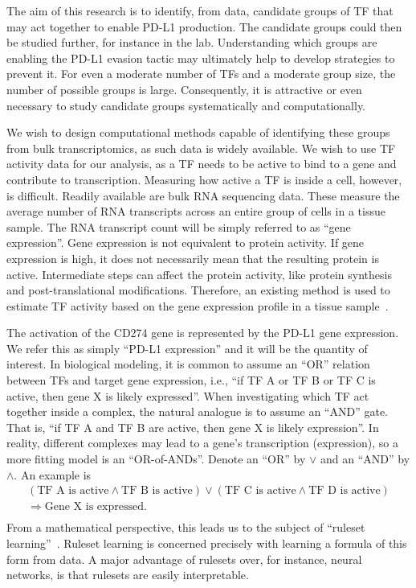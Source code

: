 The aim of this research is to identify, from data, candidate groups of TF that may act together to enable PD-L1 production.
The candidate groups could then be studied further, for instance in the lab.
Understanding which groups are enabling the PD-L1 evasion tactic may ultimately help to develop strategies to prevent it.
For even a moderate number of TFs and a moderate group size, the number of possible groups is large.
Consequently, it is attractive or even necessary to study candidate groups systematically and computationally.

We wish to design computational methods capable of identifying these groups from bulk transcriptomics,
as such data is widely available.
We wish to use TF activity data for our analysis,
as a TF needs to be active to bind to a gene and contribute to transcription.
Measuring how active a TF is inside a cell, however, is difficult.
Readily available are bulk RNA sequencing data.
These measure the average number of RNA transcripts across an entire group of cells in a tissue sample.
The RNA transcript count will be simply referred to as ``gene expression''.
Gene expression is not equivalent to protein activity.
If gene expression is high, it does not necessarily mean that the resulting protein is active.
Intermediate steps can affect the protein activity, like protein synthesis and post-translational modifications.
Therefore, an existing method is used to estimate TF activity based on the gene expression profile in a tissue sample~\cite{badia-i-mompel_decoupler_2022}.

The activation of the CD274 gene is represented by the PD-L1 gene expression.
We refer this as simply ``PD-L1 expression'' and it will be the quantity of interest.
In biological modeling, it is common to assume an ``OR'' relation between TFs and target gene expression, i.e.,
``if TF A or TF B or TF C is active, then gene X is likely expressed''.
When investigating which TF act together inside a complex, the natural analogue is to assume an ``AND'' gate.
That is, ``if TF A and TF B are active, then gene X is likely expression''.
In reality, different complexes may lead to a gene's transcription (expression), so a more fitting model is an
``OR-of-ANDs''.
Denote an ``OR'' by $\vee$ and an ``AND'' by $\wedge.$
An example is
\begin{gather*}
    (\text{TF A is active} \wedge \text{TF B is active}) \lor (\text{TF C is active} \wedge \text{TF D is active})\\
    \Longrightarrow \text{Gene X is expressed}.\\
\end{gather*}
From a mathematical perspective, this leads us to the subject of ``ruleset learning''~\cite{yang_learning_2022}.
Ruleset learning is concerned precisely with learning a formula of this form from data.
A major advantage of rulesets over, for instance, neural networks, is that rulesets are easily interpretable.

